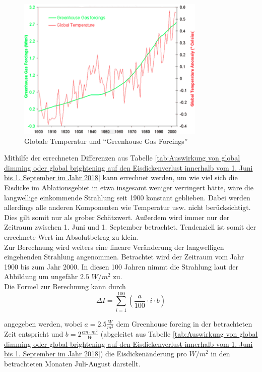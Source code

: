 \documentclass[11pt,a4paper]{article}
\begin{document}
\begin{figure}[H]
\centering
\includegraphics[width=0.8\textwidth]{pictures/greenhouse_gas_forcing.png}
\caption[Globale Temperatur und ``Greenhouse Gas Forcings'']{Globale Temperatur und ``Greenhouse Gas Forcings'' \parencite{GreenhouseGasForcing}}
\label{Globale Temperatur und ``Greenhouse Gas Forcings''}
\end{figure}


Mithilfe der errechneten Differenzen aus Tabelle \ref{tab:Auswirkung von global dimming oder global brightening auf den Eisdickenverlust innerhalb vom 1. Juni bis 1. September im Jahr 2018} kann errechnet werden, um wie viel sich die Eisdicke im Ablationsgebiet in etwa insgesamt weniger verringert hätte, wäre die langwellige einkommende Strahlung seit 1900 konstant geblieben. Dabei werden allerdings alle anderen Komponenten wie Temperatur usw. nicht berücksichtigt. Dies gilt somit nur als grober Schätzwert. Außerdem wird immer nur der Zeitraum zwischen 1. Juni und 1. September betrachtet. Tendenziell ist somit der errechnete Wert im Absolutbetrag zu klein.\\

Zur Berechnung wird weiters eine lineare Veränderung der langwelligen eingehenden Strahlung angenommen. Betrachtet wird der Zeitraum vom Jahr 1900 bis zum Jahr 2000. In diesen 100 Jahren nimmt die Strahlung laut der Abbildung um ungefähr $2.5$ $W/m^2$ zu.\\

Die Formel zur Berechnung kann durch
\begin{equation}
\Delta I =\sum_{i=1}^{100}\left ( \frac{a}{100}\cdot i \cdot b \right )
\end{equation}

angegeben werden, wobei $a=2.5\frac{W}{m^2}$ dem Greenhouse forcing in der betrachteten Zeit entspricht und $b=2 \frac{cm \cdot m^2}{W}$ (abgeleitet aus Tabelle \ref{tab:Auswirkung von global dimming oder global brightening auf den Eisdickenverlust innerhalb vom 1. Juni bis 1. September im Jahr 2018}) die Eisdickenänderung pro $W/m^2$ in den betrachteten Monaten Juli-August darstellt.\\
\end{document}
